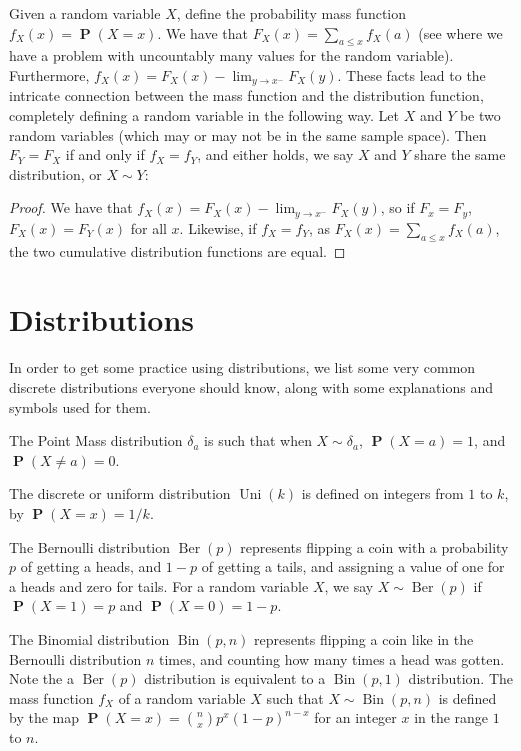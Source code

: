 \documentclass{report}
\DeclareMathOperator{\prob}{\mathbf{P}}
\DeclareMathOperator{\Ber}{Ber}
\DeclareMathOperator{\Bin}{Bin}
\DeclareMathOperator{\Uni}{Uni}
\begin{document}
Given a random variable $X$, define the probability mass function $f_X(x) = \prob(X = x)$. We have that $F_X(x) = \sum_{a \leq x} f_X(a)$ (see where we have a problem with uncountably many values for the random variable). Furthermore, $f_X(x) = F_X(x) - \lim_{y \to x^-} F_X(y)$. These facts lead to the intricate connection between the mass function and the distribution function, completely defining a random variable in the following way. Let $X$ and $Y$ be two random variables (which may or may not be in the same sample space). Then $F_Y = F_X$ if and only if $f_X = f_Y$, and either holds, we say $X$ and $Y$ share the same distribution, or $X \sim Y$:
\begin{proof}
    We have that $f_X(x) = F_X(x) - \lim_{y \to x^-} F_X(y)$, so if $F_x = F_y$, $F_X(x) = F_Y(x)$ for all $x$. Likewise, if $f_X = f_Y$, as $F_X(x) = \sum_{a \leq x} f_X(a)$, the two cumulative distribution functions are equal.
\end{proof}

\section{Distributions}

In order to get some practice using distributions, we list some very common discrete distributions everyone should know, along with some explanations and symbols used for them.

The Point Mass distribution $\delta_a$ is such that when $X \sim \delta_a$, $\prob(X = a) = 1$, and $\prob(X \neq a) = 0$.

The discrete or uniform distribution $\Uni(k)$ is defined on integers from $1$ to $k$, by $\prob(X = x) = 1/k$.

The Bernoulli distribution $\Ber(p)$ represents flipping a coin with a probability $p$ of getting a heads, and $1 - p$ of getting a tails, and assigning a value of one for a heads and zero for tails. For a random variable $X$, we say $X \sim \Ber(p)$ if $\prob(X = 1) = p$ and $\prob(X = 0) = 1 - p$.

The Binomial distribution $\Bin(p,n)$ represents flipping a coin like in the Bernoulli distribution $n$ times, and counting how many times a head was gotten. Note the a $\Ber(p)$ distribution is equivalent to a $\Bin(p,1)$ distribution. The mass function $f_X$ of a random variable $X$ such that $X \sim \Bin(p,n)$ is defined by the map $\prob(X = x) = {n \choose x}p^x(1-p)^{n-x}$ for an integer $x$ in the range $1$ to $n$.
\end{document}
